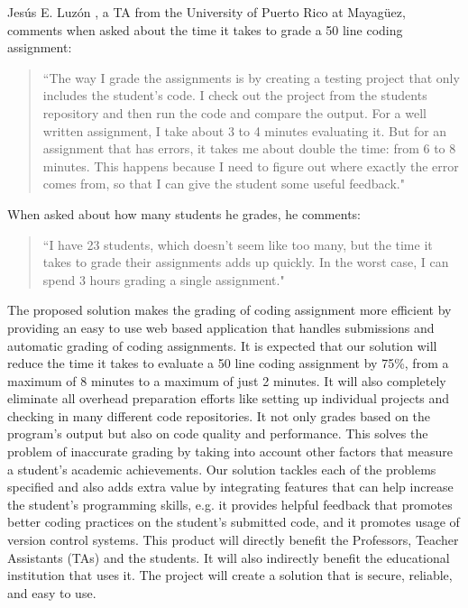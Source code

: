 Jesús E. Luzón \cite{Chiki}, a TA from the University of Puerto Rico at
Mayagüez, comments when asked about the time it takes to grade a 50 line coding
assignment: \begin{quote} ``The way I grade the assignments is by creating a
testing project that only includes the student's code. I check out the project
from the students repository and then run the code and compare the output. For a
well written assignment, I take about 3 to 4 minutes evaluating it. But for an
assignment that has errors, it takes me about double the time: from 6 to 8
minutes. This happens because I need to figure out where exactly the error comes
from, so that I can give the student some useful feedback." \end{quote} When
asked about how many students he grades, he comments: \begin{quote} ``I have 23
students, which doesn't seem like too many, but the time it takes to grade their
assignments adds up quickly. In the worst case, I can spend 3 hours grading a
single assignment." \end{quote}


The proposed solution makes the grading of coding assignment more efficient by
providing an easy to use web based application that handles submissions and
automatic grading of coding assignments. It is expected that our solution will
reduce the time it takes to evaluate a 50 line coding assignment by 75\%, from a
maximum of 8 minutes to a maximum of just 2 minutes. It will also completely
eliminate all overhead preparation efforts like setting up individual projects
and checking in many different code repositories. It not only grades based on
the program's output but also on code quality and performance. This solves the
problem of inaccurate grading by taking into account other factors that measure
a student's academic achievements. Our solution tackles each of the problems
specified and also adds extra value by integrating features that can help
increase the student's programming skills, e.g. it provides helpful feedback
that promotes better coding practices on the student's submitted code, and it
promotes usage of version control systems. This product will directly benefit
the Professors, Teacher Assistants (TAs) and the students. It will also
indirectly benefit the educational institution that uses it. The project will
create a solution that is secure, reliable, and easy to use.
